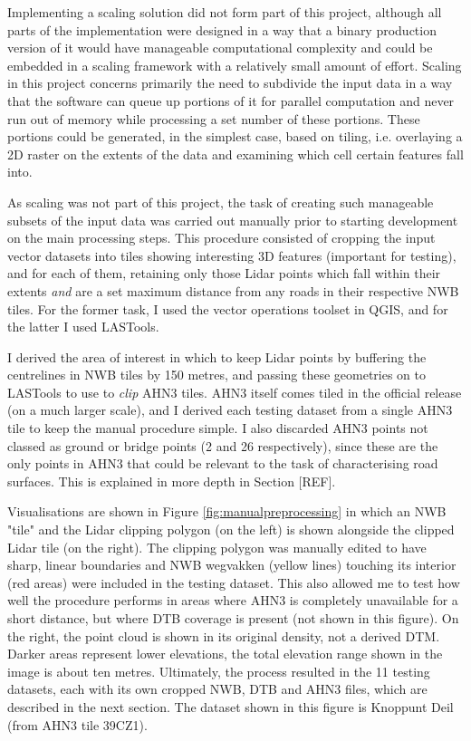 Implementing a scaling solution did not form part of this project, although all parts of the implementation were designed in a way that a binary production version of it would have manageable computational complexity and could be embedded in a scaling framework with a relatively small amount of effort. Scaling in this project concerns primarily the need to subdivide the input data in a way that the software can queue up portions of it for parallel computation and never run out of memory while processing a set number of these portions. These portions could be generated, in the simplest case, based on tiling, i.e. overlaying a 2D raster on the extents of the data and examining which cell certain features fall into.

As scaling was not part of this project, the task of creating such manageable subsets of the input data was carried out manually prior to starting development on the main processing steps. This procedure consisted of cropping the input vector datasets into tiles showing interesting 3D features (important for testing), and for each of them, retaining only those Lidar points which fall within their extents \textit{and} are a set maximum distance from any roads in their respective NWB tiles. For the former task, I used the vector operations toolset in QGIS, and for the latter I used LASTools.

I derived the area of interest in which to keep Lidar points by buffering the centrelines in NWB tiles by 150 metres, and passing these geometries on to LASTools to use to \textit{clip} AHN3 tiles. AHN3 itself comes tiled in the official release (on a much larger scale), and I derived each testing dataset from a single AHN3 tile to keep the manual procedure simple. I also discarded AHN3 points not classed as ground or bridge points (2 and 26 respectively), since these are the only points in AHN3 that could be relevant to the task of characterising road surfaces. This is explained in more depth in Section [REF]. 

Visualisations are shown in Figure \ref{fig:manualpreprocessing} in which an NWB "tile" and the Lidar clipping polygon (on the left) is shown alongside the clipped Lidar tile (on the right). The clipping polygon was manually edited to have sharp, linear boundaries and NWB wegvakken (yellow lines) touching its interior (red areas) were included in the testing dataset. This also allowed me to test how well the procedure performs in areas where AHN3 is completely unavailable for a short distance, but where DTB coverage is present (not shown in this figure). On the right, the point cloud is shown in its original density, not a derived DTM. Darker areas represent lower elevations, the total elevation range shown in the image is about ten metres. Ultimately, the process resulted in the 11 testing datasets, each with its own cropped NWB, DTB and AHN3 files, which are described in the next section. The dataset shown in this figure is Knoppunt Deil (from AHN3 tile 39CZ1).

